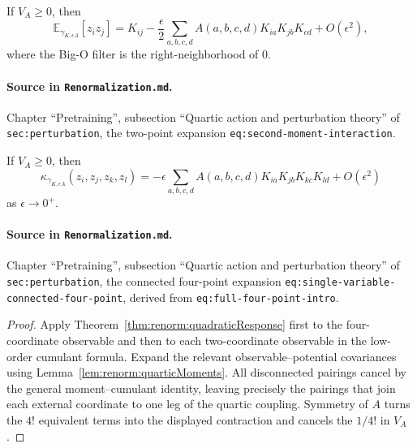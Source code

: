 \begin{theorem}
\label{thm:renorm:quarticTwoPoint}
If $V_A\geq0$, then
\[
 \mathbb E_{\gamma_{K,\epsilon A}}[z_i z_j]
 =K_{ij}-\frac{\epsilon}{2}
   \sum_{a,b,c,d}A(a,b,c,d)K_{ia}K_{jb}K_{cd}+O(\epsilon^2),
\]
where the Big-O filter is the right-neighborhood of $0$.

\paragraph{Source in \texttt{Renormalization.md}.}
Chapter ``Pretraining'', subsection ``Quartic action and perturbation theory'' of
\texttt{sec:perturbation}, the two-point expansion \texttt{eq:second-moment-interaction}.
\end{theorem}

\begin{theorem}
\label{thm:renorm:quarticFourPoint}
If $V_A\geq0$, then
\[
 \kappa_{\gamma_{K,\epsilon A}}(z_i,z_j,z_k,z_l)
 =-\epsilon\sum_{a,b,c,d}A(a,b,c,d)
     K_{ia}K_{jb}K_{kc}K_{ld}+O(\epsilon^2)
\]
as $\epsilon\to0^+$.

\paragraph{Source in \texttt{Renormalization.md}.}
Chapter ``Pretraining'', subsection ``Quartic action and perturbation theory'' of
\texttt{sec:perturbation}, the connected four-point expansion
\texttt{eq:single-variable-connected-four-point}, derived from
\texttt{eq:full-four-point-intro}.
\end{theorem}

\begin{proof}
Apply Theorem~\ref{thm:renorm:quadraticResponse} first to the four-coordinate observable and then
to each two-coordinate observable in the low-order cumulant formula.  Expand the relevant
observable--potential covariances using Lemma~\ref{lem:renorm:quarticMoments}.  All disconnected
pairings cancel by the general moment--cumulant identity, leaving precisely the pairings that join
each external coordinate to one leg of the quartic coupling.  Symmetry of $A$ turns the $4!$
equivalent terms into the displayed contraction and cancels the $1/4!$ in $V_A$.
\end{proof}

